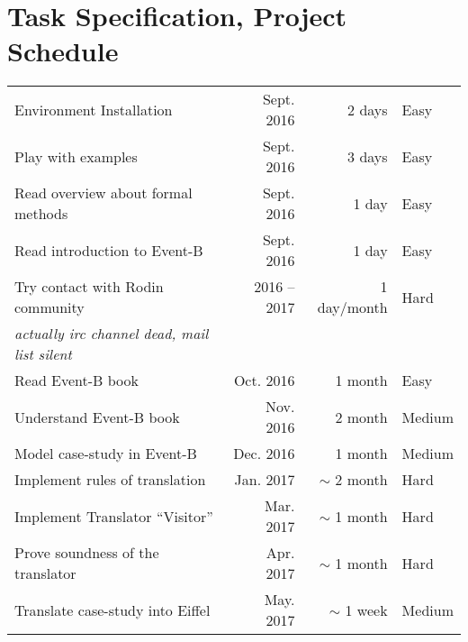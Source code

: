 \section{Task Specification, Project Schedule}

\begin{tabular}{lrrl}
  Environment Installation & Sept. 2016 & 2 days & Easy\\
  Play with examples & Sept. 2016 & 3 days & Easy\\
  Read overview about formal methods & Sept. 2016 & 1 day & Easy\\
  Read introduction to Event-B & Sept. 2016 & 1 day & Easy\\
  Try contact with Rodin community & 2016 -- 2017 & 1 day/month & Hard\\
  \textit{\color{black!40} actually irc channel dead, mail list silent}& & & \\
  Read Event-B book \cite{eventb} & Oct. 2016 & 1 month & Easy\\
  \hline
  Understand Event-B book \cite{eventb} & Nov. 2016 & 2 month & Medium\\
  Model case-study in Event-B & Dec. 2016 & 1 month & Medium\\
  Implement rules of translation & Jan. 2017 & $\sim$ 2 month & Hard\\
  Implement Translator ``Visitor'' & Mar. 2017 & $\sim$ 1 month & Hard\\
  Prove soundness of the translator & Apr. 2017 & $\sim$ 1 month & Hard\\
  Translate case-study into Eiffel & May. 2017 & $\sim$ 1 week & Medium\\

\end{tabular}
